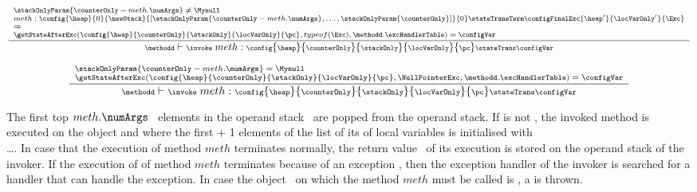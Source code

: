 \begin{itemize}
	  $${\scriptsize \frac{\begin{array}{l}
	                        \stackOnlyParam{ \counterOnly - meth.\numArgs } \neq \Mynull   \\
	                         meth: %
			                        \config{\heap}       
                                                       {0}
						       {\newStack }
                                                       {\lbrack \stackOnlyParam{ \counterOnly - meth.\numArgs },\ldots ,\stackOnlyParam{ \counterOnly} \rbrack }
						       {0} 
						         \stateTransTerm 
						       \configFinalExc{\heap'}{\locVarOnly'}{\Exc}\\
					   \Rightarrow \\
					  \getStateAfterExc( \config{\heap}{\counterOnly}{\stackOnly}{\locVarOnly}{\pc}, typeof(\Exc)  ,\methodd.\excHandlerTable ) =  \configVar
	         \end{array} 	      
	         }	         
	         {\methodd \vdash \invoke \  meth :  \config{\heap}{\counterOnly}{\stackOnly}{\locVarOnly}{\pc} 
		                        \stateTrans  
					\configVar} } $$


	  $${\scriptsize \frac{\begin{array}{l}
	                         \stackOnlyParam{ \counterOnly - meth.\numArgs } = \Mynull   \\ 
				 \getStateAfterExc( \config{\heap}{\counterOnly}{\stackOnly}{\locVarOnly}{\pc},\NullPointerExc,\methodd.\excHandlerTable ) =  \configVar
	         \end{array} 	      
	         }	         
	         {\methodd \vdash \invoke \  meth :  \config{\heap}{\counterOnly}{\stackOnly}{\locVarOnly}{\pc} 
		                        \stateTrans  
					\configVar} } $$					
	  

	 The first top $meth.\numArgs$ \ elements in the operand stack \stackOnly \ are popped from the operand stack. If 
          is not \Mynull, the invoked method is executed on the object    
	 and where the first \numArgs + 1 elements of the list of its of local variables is initialised with \\
          \ldots \stackOnlyParam{\counterOnly}. In case that the execution of method $meth$
	 terminates normally, the return value \Res \  of its execution is stored on the operand stack of the invoker. 
	 If the execution of of method $meth$ terminates because of an exception \Exc, then the exception handler of the invoker is searched for
	 a handler that can handle the exception. In case the object   \  on which the  method $meth$ must be 
	 called is \Mynull, a \NullPointerExc is thrown.  			





\end{itemize}

